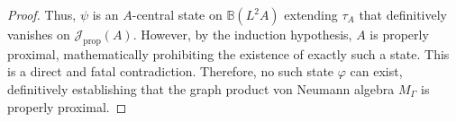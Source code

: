\documentclass[12pt]{article}
\begin{document}
\begin{proof}
Thus, $\psi$ is an $A$-central state on $\mathbb{B}(L^2A)$ extending $\tau_A$ that definitively vanishes on $\mathcal{J}_{\mathrm{prop}}(A)$. However, by the induction hypothesis, $A$ is properly proximal, mathematically prohibiting the existence of exactly such a state. 
This is a direct and fatal contradiction. Therefore, no such state $\varphi$ can exist, definitively establishing that the graph product von Neumann algebra $M_\Gamma$ is properly proximal.
\end{proof}
\end{document}
